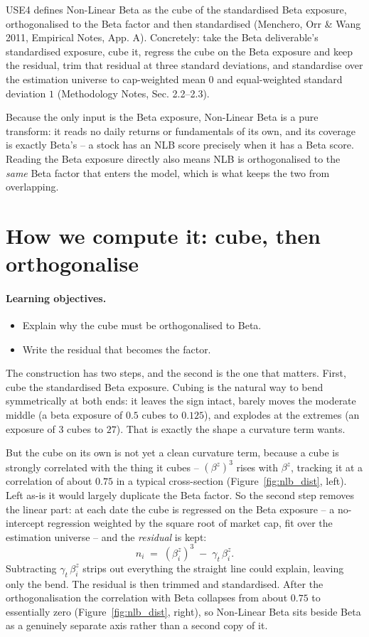 \documentclass[11pt]{article}
\theoremstyle{definition}
\theoremstyle{plain}
\theoremstyle{remark}
\begin{document}
USE4 defines Non-Linear Beta as the cube of the standardised Beta exposure, orthogonalised to the Beta factor and then standardised (Menchero, Orr \& Wang 2011, Empirical Notes, App. A). Concretely: take the Beta deliverable's standardised exposure, cube it, regress the cube on the Beta exposure and keep the residual, trim that residual at three standard deviations, and standardise over the estimation universe to cap-weighted mean $0$ and equal-weighted standard deviation $1$ (Methodology Notes, Sec. 2.2--2.3).

Because the only input is the Beta exposure, Non-Linear Beta is a pure transform: it reads no daily returns or fundamentals of its own, and its coverage is exactly Beta's -- a stock has an NLB score precisely when it has a Beta score. Reading the Beta exposure directly also means NLB is orthogonalised to the \emph{same} Beta factor that enters the model, which is what keeps the two from overlapping.

\section{How we compute it: cube, then orthogonalise}\label{sec:compute}

\paragraph{Learning objectives.}
\begin{itemize}[leftmargin=1.4em,topsep=2pt]
  \item Explain why the cube must be orthogonalised to Beta.
  \item Write the residual that becomes the factor.
\end{itemize}

The construction has two steps, and the second is the one that matters. First, cube the standardised Beta exposure. Cubing is the natural way to bend symmetrically at both ends: it leaves the sign intact, barely moves the moderate middle (a beta exposure of $0.5$ cubes to $0.125$), and explodes at the extremes (an exposure of $3$ cubes to $27$). That is exactly the shape a curvature term wants.

But the cube on its own is not yet a clean curvature term, because a cube is strongly correlated with the thing it cubes -- $(\beta^{z})^{3}$ rises with $\beta^{z}$, tracking it at a correlation of about $0.75$ in a typical cross-section (Figure~\ref{fig:nlb_dist}, left). Left as-is it would largely duplicate the Beta factor. So the second step removes the linear part: at each date the cube is regressed on the Beta exposure -- a no-intercept regression weighted by the square root of market cap, fit over the estimation universe -- and the \emph{residual} is kept:
\[
n_i \;=\; (\beta^{z}_i)^{3} \;-\; \gamma_t\,\beta^{z}_i .
\]
Subtracting $\gamma_t\,\beta^{z}_i$ strips out everything the straight line could explain, leaving only the bend. The residual is then trimmed and standardised. After the orthogonalisation the correlation with Beta collapses from about $0.75$ to essentially zero (Figure~\ref{fig:nlb_dist}, right), so Non-Linear Beta sits beside Beta as a genuinely separate axis rather than a second copy of it.
\end{document}
